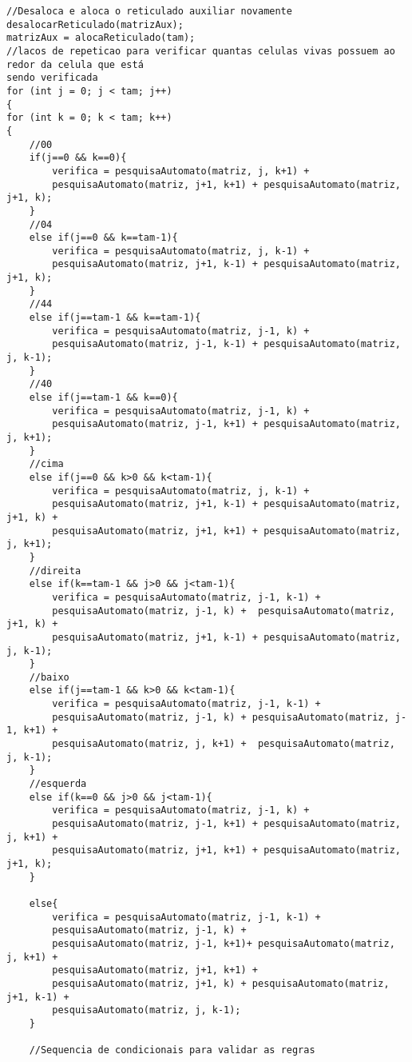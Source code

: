 \documentclass{article}
\begin{document}
\begin{verbatim}
//Desaloca e aloca o reticulado auxiliar novamente
desalocarReticulado(matrizAux);
matrizAux = alocaReticulado(tam);
//lacos de repeticao para verificar quantas celulas vivas possuem ao redor da celula que está
sendo verificada
for (int j = 0; j < tam; j++)
{
for (int k = 0; k < tam; k++)
{
    //00
    if(j==0 && k==0){
        verifica = pesquisaAutomato(matriz, j, k+1) + 
        pesquisaAutomato(matriz, j+1, k+1) + pesquisaAutomato(matriz, j+1, k);
    }
    //04
    else if(j==0 && k==tam-1){
        verifica = pesquisaAutomato(matriz, j, k-1) + 
        pesquisaAutomato(matriz, j+1, k-1) + pesquisaAutomato(matriz, j+1, k);
    }
    //44
    else if(j==tam-1 && k==tam-1){
        verifica = pesquisaAutomato(matriz, j-1, k) + 
        pesquisaAutomato(matriz, j-1, k-1) + pesquisaAutomato(matriz, j, k-1);
    }
    //40
    else if(j==tam-1 && k==0){
        verifica = pesquisaAutomato(matriz, j-1, k) + 
        pesquisaAutomato(matriz, j-1, k+1) + pesquisaAutomato(matriz, j, k+1);
    }
    //cima
    else if(j==0 && k>0 && k<tam-1){
        verifica = pesquisaAutomato(matriz, j, k-1) + 
        pesquisaAutomato(matriz, j+1, k-1) + pesquisaAutomato(matriz, j+1, k) +
        pesquisaAutomato(matriz, j+1, k+1) + pesquisaAutomato(matriz, j, k+1);
    }
    //direita
    else if(k==tam-1 && j>0 && j<tam-1){
        verifica = pesquisaAutomato(matriz, j-1, k-1) + 
        pesquisaAutomato(matriz, j-1, k) +  pesquisaAutomato(matriz, j+1, k) +
        pesquisaAutomato(matriz, j+1, k-1) + pesquisaAutomato(matriz, j, k-1);
    }
    //baixo
    else if(j==tam-1 && k>0 && k<tam-1){
        verifica = pesquisaAutomato(matriz, j-1, k-1) + 
        pesquisaAutomato(matriz, j-1, k) + pesquisaAutomato(matriz, j-1, k+1) +
        pesquisaAutomato(matriz, j, k+1) +  pesquisaAutomato(matriz, j, k-1);
    }
    //esquerda
    else if(k==0 && j>0 && j<tam-1){
        verifica = pesquisaAutomato(matriz, j-1, k) + 
        pesquisaAutomato(matriz, j-1, k+1) + pesquisaAutomato(matriz, j, k+1) +  
        pesquisaAutomato(matriz, j+1, k+1) + pesquisaAutomato(matriz, j+1, k);
    }
    
    else{
        verifica = pesquisaAutomato(matriz, j-1, k-1) + 
        pesquisaAutomato(matriz, j-1, k) +
        pesquisaAutomato(matriz, j-1, k+1)+ pesquisaAutomato(matriz, j, k+1) + 
        pesquisaAutomato(matriz, j+1, k+1) + 
        pesquisaAutomato(matriz, j+1, k) + pesquisaAutomato(matriz, j+1, k-1) + 
        pesquisaAutomato(matriz, j, k-1);
    }
    
    //Sequencia de condicionais para validar as regras


\end{verbatim}
\end{document}
